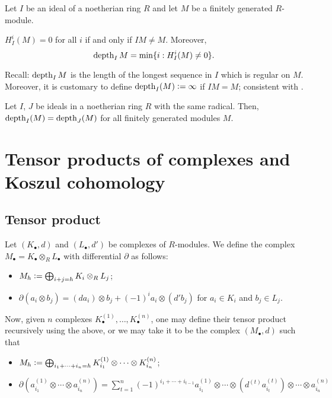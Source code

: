 \documentclass[12pt]{article}
\begin{document}
\begin{thm}
	Let $I$ be an ideal of a noetherian ring $R$ and let $M$ be a finitely generated $R$-module. 

	$H_{I}^{i}(M) = 0$ for all $i$ if and only if $IM \neq M$. Moreover,
	\begin{equation} \label{eq:002}
		\operatorname{depth}_{I} M = \min\{i : H_{I}^{i}(M) \neq 0\}.
	\end{equation}
\end{thm}
Recall: $\operatorname{depth}_{I} M$ is the length of the longest sequence in $I$ which is regular on $M$. Moreover, it is customary to define $\operatorname{depth}_{I}(M) \vcentcolon= \infty$ if $IM = M$; consistent with .

\begin{cor}
	Let $I$, $J$ be ideals in a noetherian ring $R$ with the same radical. Then, $\operatorname{depth}_{I}(M) = \operatorname{depth}_{J}(M)$ for all finitely generated modules $M$.
\end{cor}

\section{Tensor products of complexes and Koszul cohomology}

\subsection{Tensor product}

Let $(K_{\bullet}, d)$ and $(L_{\bullet}, d')$ be complexes of $R$-modules. We define the complex $M_{\bullet} = K_{\bullet} \otimes_{R} L_{\bullet}$ with differential $\partial$ as follows:
\begin{itemize}
	\item $M_{h} \vcentcolon= \bigoplus_{i + j = h} K_{i} \otimes_{R} L_{j}$;
	\item $\partial(a_{i} \otimes b_{j}) = (d a_{i}) \otimes b_{j} + (-1)^{i} a_{i} \otimes (d' b_{j})$ for $a_{i} \in K_{i}$ and $b_{j} \in L_{j}$.
\end{itemize}

Now, given $n$ complexes $K^{(1)}_{\bullet}, \ldots, K^{(n)}_{\bullet}$, one may define their tensor product recursively using the above, or we may take it to be the complex $(M_{\bullet}, d)$ such that
\begin{itemize}
	\item $M_{h} \vcentcolon= \bigoplus_{i_{1} + \cdots + i_{n} = h} K^{(1)}_{i_{1}} \otimes \cdots \otimes K^{(n)}_{i_{n}}$;
	\item $\partial(a^{(1)}_{i_{1}} \otimes \cdots \otimes a^{(n)}_{i_{n}}) = \sum_{t = 1}^{n} (-1)^{i_{1} + \cdots + i_{t - 1}} a^{(1)}_{i_{1}} \otimes \cdots \otimes (d^{(t)} a^{(t)}_{i_{t}}) \otimes \cdots \otimes a^{(n)}_{i_{n}}$
\end{itemize}
\end{document}
